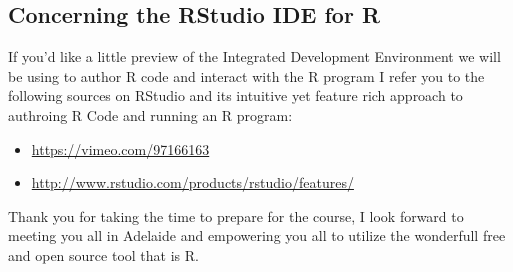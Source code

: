 \documentclass{article}[12pt]
\begin{document}
\subsection*{Concerning the RStudio IDE for R}
If you'd like a little preview of the Integrated Development Environment we will be using to author R code and interact with the R program I refer you to the following sources on RStudio and its intuitive yet feature rich approach to authroing R Code and running an R program: \begin{itemize}
\item \url{https://vimeo.com/97166163}
\item \url{http://www.rstudio.com/products/rstudio/features/}
\newline
\end{itemize}

Thank you for taking the time to prepare for the course, I look forward to meeting you all in Adelaide and empowering you all to utilize the wonderfull free and open source tool that is R.
\end{document}
